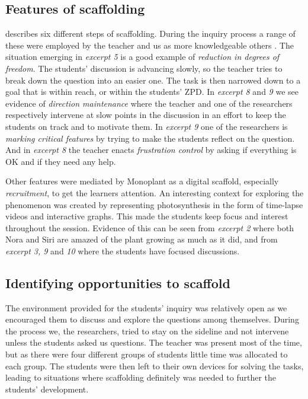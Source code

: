 \subsection{Features of scaffolding}
\citet{wood1976role} describes six different steps of scaffolding. During the inquiry process a range of these were employed by the teacher and us as more knowledgeable others \citep{vygotskiui1978mind}. The situation emerging in \emph{excerpt 5} is a good example of \emph{reduction in degrees of freedom}. The students' discussion is advancing slowly, so the teacher tries to break down the question into an easier one. The task is then narrowed down to a goal that is within reach, or within the students' ZPD. In \emph{excerpt 8} and \emph{9} we see evidence of \emph{direction maintenance} where the teacher and one of the researchers respectively intervene at slow points in the discussion in an effort to keep the students on track and to motivate them. In \emph{excerpt 9} one of the researchers is \emph{marking critical features} by trying to make the students reflect on the question. And in \emph{excerpt 8} the teacher enacts \emph{frustration control} by asking if everything is OK and if they need any help. 

Other features were mediated by Monoplant as a digital scaffold, especially \emph{recruitment}, to get the learners attention. An interesting context for exploring the phenomenon was created by representing photosynthesis in the form of time-lapse videos and interactive graphs. This made the students keep focus and interest throughout the session. Evidence of this can be seen from \emph{excerpt 2} where both Nora and Siri are amazed of the plant growing as much as it did, and from \emph{excerpt 3, 9} and \emph{10} where the students have focused discussions. 


\subsection{Identifying opportunities to scaffold}
The environment provided for the students' inquiry was relatively open as we encouraged them to discuss and explore the questions among themselves. During the process we, the researchers, tried to stay on the sideline and not intervene unless the students asked us questions. The teacher was present most of the time, but as there were four different groups of students little time was allocated to each group. The students were then left to their own devices for solving the tasks, leading to situations where scaffolding definitely was needed to further the students' development. 


